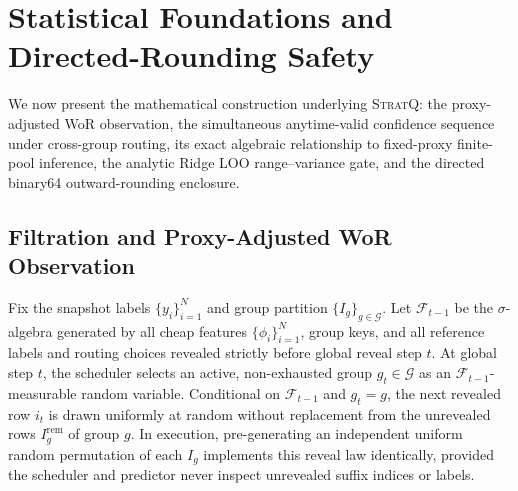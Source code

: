 \section{Statistical Foundations and Directed-Rounding Safety}
\label{sec:method}

We now present the mathematical construction underlying \textsc{StratQ}: the proxy-adjusted WoR observation, the simultaneous anytime-valid confidence sequence under cross-group routing, its exact algebraic relationship to fixed-proxy finite-pool inference, the analytic Ridge LOO range--variance gate, and the directed binary64 outward-rounding enclosure.

\subsection{Filtration and Proxy-Adjusted WoR Observation}
\label{sec:wor-obs}

Fix the snapshot labels $\{y_i\}_{i=1}^N$ and group partition $\{I_g\}_{g \in \mathcal{G}}$.
Let $\mathcal{F}_{t-1}$ be the $\sigma$-algebra generated by all cheap features $\{\phi_i\}_{i=1}^N$, group keys, and all reference labels and routing choices revealed strictly before global reveal step $t$.
At global step $t$, the scheduler selects an active, non-exhausted group $g_t \in \mathcal{G}$ as an $\mathcal{F}_{t-1}$-measurable random variable.
Conditional on $\mathcal{F}_{t-1}$ and $g_t = g$, the next revealed row $i_t$ is drawn uniformly at random without replacement from the unrevealed rows $I_g^{\text{rem}}$ of group $g$.
In execution, pre-generating an independent uniform random permutation of each $I_g$ implements this reveal law identically, provided the scheduler and predictor never inspect unrevealed suffix indices or labels.

